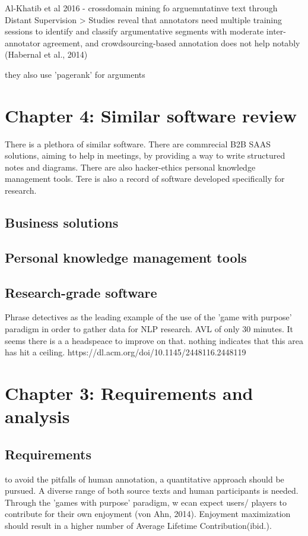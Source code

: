 \documentclass{article}
\begin{document}
Al-Khatib et al 2016 - crossdomain mining fo arguemntatinve text through Distant Supervision
> Studies reveal that annotators need multiple training sessions to identify and classify argumentative segments with moderate inter-annotator agreement, and crowdsourcing-based annotation does not help notably (Habernal et al., 2014)

they also use 'pagerank' for arguments

\section{Chapter 4: Similar software review}

There is a plethora of similar software. 
There are commrecial B2B SAAS solutions, aiming to help in meetings, by providing a way to write structured notes and diagrams.
There are also hacker-ethics personal knowledge management tools.
Tere is also a record of software developed specifically for research.

\subsection{Business solutions}

\subsection{Personal knowledge management tools}

\subsection{Research-grade software}

Phrase detectives as the leading example of the use of the 'game with purpose' paradigm in order to gather data for NLP research.
AVL of only 30 minutes. It seems there is a a headspeace to improve on that. nothing indicates that this area has hit a ceiling.
https://dl.acm.org/doi/10.1145/2448116.2448119


\section{Chapter 3: Requirements and analysis}

\subsection{Requirements}
to avoid the pitfalls of human annotation, a quantitative approach should be pursued. 
A diverse range of both source texts and human participants is needed.
Through the 'games with purpose' paradigm, w ecan expect users/ players to contribute for their own enjoyment (von Ahn, 2014).
Enjoyment maximization should result in a higher number of Average Lifetime Contribution(ibid.).
\end{document}
